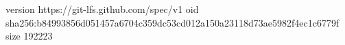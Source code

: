 version https://git-lfs.github.com/spec/v1
oid sha256:b84993856d051457a6704c359dc53cd012a150a23118d73ae5982f4ec1c6779f
size 192223

